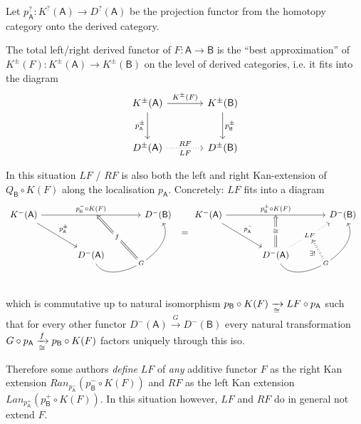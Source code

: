 \documentclass[fontsize=11pt,fleqn,a4paper]{scrartcl}
\begin{document}
\begin{definition}
Let $p_\mathsf{A}^?: K^?(\mathsf{A}) \to D^?(\mathsf{A})$ be the projection functor from the homotopy category onto the derived category.

The total left/right derived functor of $F:\mathsf{A}\to\mathsf{B}$ is the \enquote{best approximation} of $K^\pm(F): K^\pm(\mathsf{A}) \to K^\pm(\mathsf{B})$ on the level of derived categories, i.e. it fits into the diagram
\[\begin{tikzcd}[sep = large]
K^{\pm}(\mathsf{A}) \ar[r,"K^\pm(F)"] \ar[d,"p_\mathsf{A}^\pm"'] & K^{\pm}(\mathsf{B}) \ar[d,"p_\mathsf{B}^\pm"] \\
D^\pm(\mathsf{A}) \ar[r,dotted,"LF"',"RF"] & D^\pm(\mathsf{B})
\end{tikzcd}\]
\end{definition}

\begin{remark}
In this situation $LF$ / $RF$ is also both the left and right Kan-extension of $Q_\mathsf{B}\circ K(F)$ along the localisation $p_\mathsf{A}$. Concretely: $LF$ fits into a diagram
\[\begin{tikzcd}[sep = large]
K^-(\mathsf{A}) \ar[rr,"p_\mathsf{B}^-\circ K(F)"{name=top_arrow}] \ar[dr,"p_\mathsf{A}^\pm"] && D^-(\mathsf{B}) \\
 & D^-(\mathsf{A}) \ar[ur,bend right=90,"G"{name=G, description}]
\arrow[to=top_arrow,from=G, Rightarrow,"f" description]
\end{tikzcd}
=
\begin{tikzcd}[sep = large]
K^-(\mathsf{A}) \ar[rr,"p_\mathsf{B}^\pm\circ K(F)"{name=top_arrow}] \ar[dr,"p_\mathsf{A}^-"] && D^-(\mathsf{B}) \\
 & D^-(\mathsf{A}) \ar[ur,dotted,"LF"{name=LF, description}] \ar[ur,bend right=90,"G"{name=G,description}] \ar[to=top_arrow,Rightarrow,"\isomorphic" description]
\arrow[Rightarrow,dotted, to=LF, from=G,"\exists!"]
\end{tikzcd}\]
which is commutative up to natural isomorphism $p_\mathsf{B} \circ K(F) \xrightarrow[\cong]{} LF \circ p_\mathsf{A}$ such that for every other functor $D^-(\mathsf{A}) \xrightarrow{G} D^-(\mathsf{B})$ every natural transformation $G \circ p_\mathsf{A} \xrightarrow[\cong]{f} p_\mathsf{B} \circ K(F)$ factors uniquely through this iso.

Therefore some authors \emph{define} $LF$ of \emph{any} additive functor $F$ as the right Kan extension $Ran_{p_\mathsf{A}^-}( p_\mathsf{B}^- \circ K(F))$ and $RF$ as the left Kan extension $Lan_{p_\mathsf{A}^+}(p_\mathsf{B}^+\circ K(F))$. In this situation however, $LF$ and $RF$ do in general not extend $F$.
\end{remark}
\end{document}
